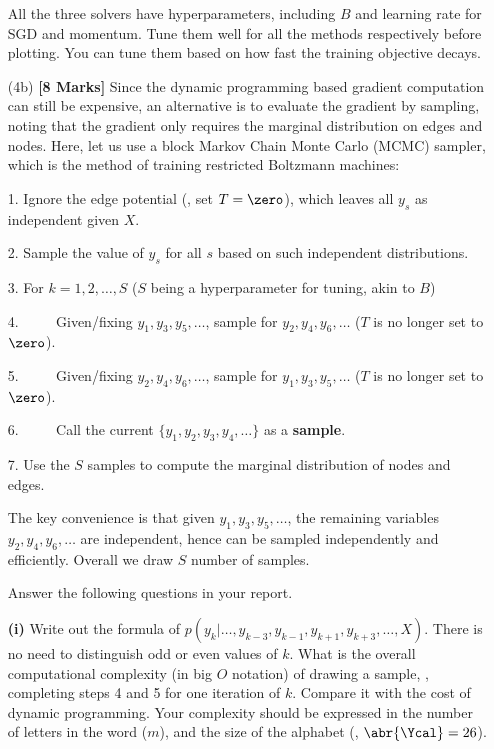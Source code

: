 \documentclass[11pt]{report}
\begin{document}
\begin{itemize}
	All the three solvers have hyperparameters, including $B$ and learning rate for SGD and momentum.
	Tune them well for all the methods respectively before plotting.
	You can tune them based on how fast the training objective decays.
	\item[(4b)] {\bf [8 Marks]} 
	Since the dynamic programming based gradient computation can still be expensive,
	an alternative is to evaluate the gradient by sampling,
	noting that the gradient only requires the marginal distribution on edges and nodes.
	Here, let us use a block Markov Chain Monte Carlo (MCMC) sampler,
	which is the method of training restricted Boltzmann machines:	
	
	1. Ignore the edge potential (\ie, set $T=\zero$), which leaves all $y_s$ as independent given $X$.
	
	2. Sample the value of $y_s$ for all $s$ based on such independent distributions.
	
	3. For $k = 1, 2, \ldots, S$ ($S$ being a hyperparameter for tuning, akin to $B$)
	
	4. $\qquad$ Given/fixing $y_1, y_3, y_5, \ldots$, sample for $y_2, y_4, y_6, \ldots$ ($T$ is no longer set to $\zero$).
	
	5. $\qquad$ Given/fixing $y_2, y_4, y_6, \ldots$, sample for $y_1, y_3, y_5, \ldots$ ($T$ is no longer set to $\zero$).
	
	6. $\qquad$ Call the current $\{y_1, y_2, y_3, y_4, \ldots\}$ as a \textbf{sample}.
	
	7. Use the $S$ samples to compute the marginal distribution of nodes and edges.
	
	The key convenience is that given $y_1, y_3, y_5, \ldots$, 
	the remaining variables $y_2, y_4, y_6, \ldots$ are independent, hence can be sampled independently and efficiently.
	Overall we draw $S$ number of samples.
	
	
	
	
	Answer the following questions in your report.
	
	\textbf{(i)} 
	Write out the formula of $p(y_k|\ldots, y_{k-3}, y_{k-1}, y_{k+1}, y_{k+3}, \ldots, X)$.
	There is no need to distinguish odd or even values of $k$. 
	What is the overall computational complexity (in big $O$ notation) of drawing a sample, \ie, completing steps 4 and 5 for one iteration of $k$.
	Compare it with the cost of dynamic programming.
	Your complexity should be expressed in the number of letters in the word ($m$),
	and the size of the alphabet (\ie, $\abr{\Ycal}=26$).
	

\end{itemize}
\end{document}
